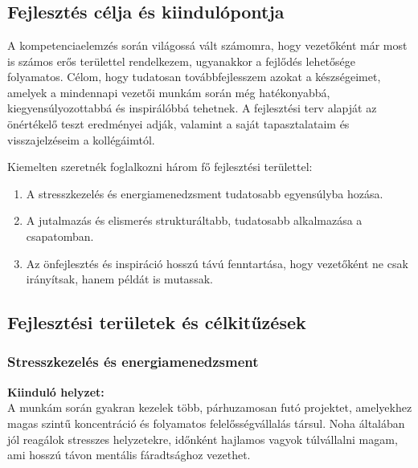 \chapter{\DevelopementPlan}
\section{Fejlesztés célja és kiindulópontja}

A kompetenciaelemzés során világossá vált számomra, hogy vezetőként már most is számos erős 
területtel rendelkezem, ugyanakkor a fejlődés lehetősége folyamatos.
Célom, hogy tudatosan továbbfejlesszem azokat a készségeimet, amelyek a mindennapi vezetői 
munkám során még hatékonyabbá, kiegyensúlyozottabbá és inspirálóbbá tehetnek.
A fejlesztési terv alapját az önértékelő teszt eredményei adják, valamint a saját 
tapasztalataim és visszajelzéseim a kollégáimtól.

Kiemelten szeretnék foglalkozni három fő fejlesztési területtel:

\begin{enumerate}
    \item A stresszkezelés és energiamenedzsment tudatosabb egyensúlyba hozása.
    \item A jutalmazás és elismerés strukturáltabb, tudatosabb alkalmazása a csapatomban.
    \item Az önfejlesztés és inspiráció hosszú távú fenntartása, hogy vezetőként ne csak irányítsak, hanem példát is mutassak.
\end{enumerate}

\section{Fejlesztési területek és célkitűzések}

\subsection{Stresszkezelés és energiamenedzsment}

\textbf{Kiinduló helyzet:} \\
A munkám során gyakran kezelek több, párhuzamosan futó projektet, amelyekhez magas szintű 
koncentráció és folyamatos felelősségvállalás társul.
Noha általában jól reagálok stresszes helyzetekre, időnként hajlamos vagyok túlvállalni magam, 
ami hosszú távon mentális fáradtsághoz vezethet.

